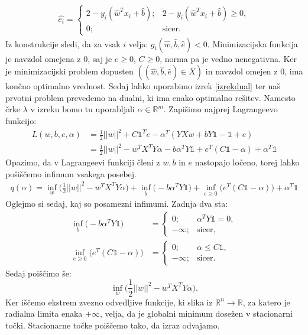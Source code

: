 \documentclass[mat1]{fmfdelo}
\newcommand{\R}{\mathbb R}
\begin{document}
\begin{align*}
\widehat{e_i} = 
\begin{cases}
2 - y_i(\widehat{w}^Tx_i+\widehat{b});  &2 - y_i(\widehat{w}^Tx_i+\widehat{b}) \ge 0, \\
0;  &\text{sicer.}
\end{cases}
\end{align*}
Iz konstrukcije sledi, da za vsak $i$ velja: $g_i(\widehat{w}, \widehat{b}, \widehat{e}) < 0.$ Minimizacijska funkcija je navzdol omejena z $0$, saj je $e\ge 0$, $C\ge 0$, norma pa je vedno nenegativna. Ker je minimizacijski problem dopusten $((\widehat{w}, \widehat{b}, \widehat{e}) \in X)$ in navzdol omejen z $0$, ima končno optimalno vrednost. Sedaj lahko uporabimo izrek \ref{izrekdual} ter naš prvotni problem prevedemo na dualni, ki ima enako optimalno rešitev. Namesto črke $\lambda$ v izreku bomo tu uporabljali $\alpha \in \R^m.$  Zapišimo najprej Lagrangeevo funkcijo: 
\begin{align*}
L(w, b, e, \alpha) &= \frac{1}{2}||w||^2 + C\mathds{1} ^Te - \alpha^T(YXw + bY\mathds{1} -  \mathds{1}  + e) \\
&= \frac{1}{2}||w||^2 - w^TX^TY\alpha - b\alpha^TY\mathds{1}  + e^T(C\mathds{1} -\alpha) + \alpha^T\mathds{1} 
\end{align*}
Opazimo, da v Lagrangeevi funkciji členi z $w, b$ in $e$ nastopajo ločeno, torej lahko pošiščemo infimum vsakega posebej. 
\begin{align*}
q(\alpha) = \inf_{w}\bigg(\frac{1}{2}||w||^2 - w^TX^TY\alpha\bigg) + \inf_{b}\bigg(\!-b\alpha^TY\mathds{1}\!\bigg) + \inf_{e \ge 0}\bigg(\!e^T(C\mathds{1}-\alpha)\!\bigg) + \alpha^T\mathds{1}
\end{align*}
Oglejmo si sedaj, kaj so posamezni infimumi. Zadnja dva sta: 
\begin{align}
\nonumber\inf_{b}\bigg(-b\alpha^TY\mathds{1}\bigg) &= 
\begin{cases}
0; &\alpha^TY\mathds{1} = 0,\\
- \infty;  &\text{sicer,}
\end{cases}\\
\label{sndmin}\inf_{e\ge 0}\bigg(e^T(C\mathds{1}-\alpha)\bigg) &= 
\begin{cases}
0; & \alpha \le C\mathds{1},\\
-\infty; & \text{sicer.}
\end{cases}
\end{align}
Sedaj poiščimo še: 
$$ \inf_{w}\bigg(\frac{1}{2}||w||^2 - w^TX^TY\alpha\bigg). $$
Ker iščemo ekstrem zvezno odvedljive funkcije, ki slika iz $\R^n \to \R$, za katero je radialna limita enaka $+\infty$, velja, da je globalni minimum dosežen v stacionarni točki. Stacionarne točke poiščemo tako, da izraz odvajamo.
\end{document}
